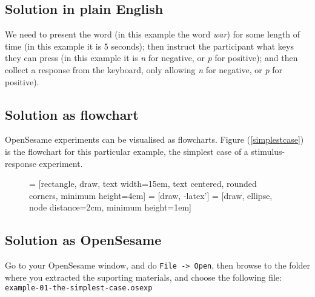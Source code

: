 \documentclass[a4paper]{tufte-handout}
\begin{document}
\subsection{Solution in plain English}
We need to present the word (in this example the word \emph{war}) for some length of time (in this example it is 5 seconds); then instruct the participant what keys they can press (in this example it is \emph{n} for negative, or \emph{p} for positive); and then collect a response from the keyboard, only allowing \emph{n} for negative, or \emph{p} for positive).

\subsection{Solution as flowchart}
OpenSesame experiments can be visualised as flowcharts. Figure (\ref{simplestcase}) is the flowchart for this particular example, the simplest case of a stimulus-response experiment.
\begin{figure}
\centering
{} = [rectangle, draw, text width=15em, text centered, rounded corners, minimum height=4em]
 = [draw, -latex']
 = [draw, ellipse, node distance=2cm, minimum height=1em]
\end{figure}

\subsection{Solution as OpenSesame}
Go to your OpenSesame window, and do \texttt{File -> Open}, then browse to the folder where you extracted the suporting materials, and choose the following file: \texttt{example-01-the-simplest-case.osexp}

\end{document}

